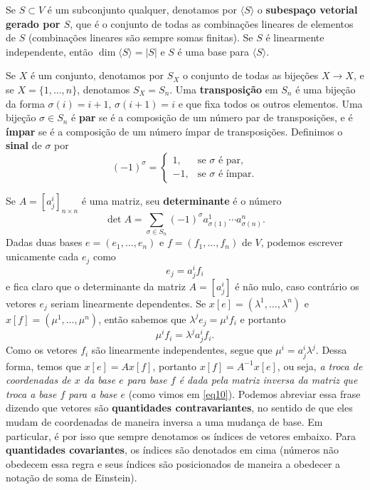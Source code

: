 \documentclass{article}
\begin{document}
Se $S \subset V$ é um subconjunto qualquer, denotamos por $\langle S \rangle$ o \textbf{subespaço vetorial gerado por $S$}, que é o conjunto de todas as combinações lineares de elementos de $S$ (combinações lineares são sempre somas finitas). Se $S$ é linearmente independente, então $\dim \langle S \rangle = |S|$ e $S$ é uma base para $\langle S \rangle$.

Se $X$ é um conjunto, denotamos por $S_X$ o conjunto de todas as bijeções $X \to X$, e se $X = \{1, \dots, n\}$, denotamos $S_X = S_n$. Uma \textbf{transposição} em $S_n$ é uma bijeção da forma $\sigma(i) = i+1$, $\sigma(i+1) = i$ e que fixa todos os outros elementos. Uma bijeção $\sigma \in S_n$ é \textbf{par} se é a composição de um número par de transposições, e é \textbf{ímpar} se é a composição de um número ímpar de transposições. Definimos o \textbf{sinal} de $\sigma$ por \begin{equation}
    (-1)^\sigma = \begin{cases}
        1, &\text{se } \sigma \text{ é par}, \\
        -1, &\text{se } \sigma \text{ é  ímpar}.
    \end{cases}
\end{equation}


Se $A = [a^i_j]_{n \times n}$ é uma matriz, seu \textbf{determinante} é o número \begin{equation}
    \det A = \sum_{\sigma \in S_n} (-1)^\sigma a^1_{\sigma(1)} \cdots a^n_{\sigma(n)}.
\end{equation}
Dadas duas bases $e = (e_1, \dots, e_n)$ e $f = (f_1, \dots, f_n)$ de $V$, podemos escrever unicamente cada $e_j$ como \begin{equation}\label{eq10}
    e_j = a^i_j f_i
\end{equation} e fica claro que o determinante da matriz $A = [a^i_j]$ é não nulo, caso contrário os vetores $e_j$ seriam linearmente dependentes. Se $x[e] = (\lambda^1, \dots, \lambda^n)$ e $x[f] = (\mu^1, \dots, \mu^n)$, então sabemos que $\lambda^j e_j = \mu^i f_i$ e portanto \begin{equation}
    \mu^i f_i = \lambda^j a^i_j f_i.
\end{equation} Como os vetores $f_i$ são linearmente independentes, segue que $\mu^i = a^i_j \lambda^j$. Dessa forma, temos que $x[e] = A x[f]$, portanto $x[f] = A^{-1} x[e]$, ou seja, \textit{a troca de coordenadas de $x$ da base $e$ para base $f$ é dada pela matriz inversa da matriz que troca a base $f$ para a base $e$} (como vimos em \ref{eq10}). Podemos abreviar essa frase dizendo que vetores são \textbf{quantidades contravariantes}, no sentido de que eles mudam de coordenadas de maneira inversa a uma mudança de base. Em particular, é por isso que sempre denotamos os índices de vetores embaixo. Para \textbf{quantidades covariantes}, os índices são denotados em cima (números não obedecem essa regra e seus índices são posicionados de maneira a obedecer a notação de soma de Einstein).
\end{document}
